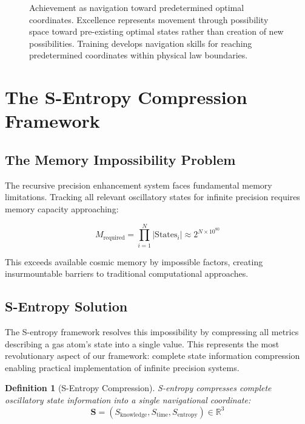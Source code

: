 \documentclass[12pt,a4paper]{article}
\newtheorem{definition}[theorem]{Definition}
\begin{document}
\begin{figure}[h]
\caption{Achievement as navigation toward predetermined optimal coordinates. Excellence represents movement through possibility space toward pre-existing optimal states rather than creation of new possibilities. Training develops navigation skills for reaching predetermined coordinates within physical law boundaries.}
\label{fig:achievement_navigation}
\end{figure}

\section{The S-Entropy Compression Framework}

\subsection{The Memory Impossibility Problem}

The recursive precision enhancement system faces fundamental memory limitations. Tracking all relevant oscillatory states for infinite precision requires memory capacity approaching:

$$M_{\text{required}} = \prod_{i=1}^{N} |\text{States}_i| \approx 2^{N \times 10^{80}}$$

This exceeds available cosmic memory by impossible factors, creating insurmountable barriers to traditional computational approaches.

\subsection{S-Entropy Solution}

The S-entropy framework resolves this impossibility by compressing all metrics describing a gas atom's state into a single value. This represents the most revolutionary aspect of our framework: complete state information compression enabling practical implementation of infinite precision systems.

\begin{definition}[S-Entropy Compression]
S-entropy compresses complete oscillatory state information into a single navigational coordinate:
$$\mathbf{S} = (S_{\text{knowledge}}, S_{\text{time}}, S_{\text{entropy}}) \in \mathbb{R}^3$$
\end{definition}
\end{document}
